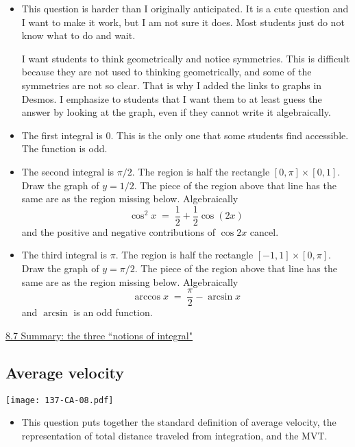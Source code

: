 \documentclass[11pt]{article}
\newcommand {\DS} [1] {${\displaystyle #1}$}
\newcommand{\nl}{\hfill \vspace{-1.1\baselineskip}} %
\newcommand{\vvii}{\hspace{8mm} \href{https://www.youtube.com/watch?v=LBhvzrRyAtk&list=PLlwePzQY_wW_8-sITAbG_GU2JgiuwXkDN&index=7}{8.7 Summary: the three ``notions of integral"}}
\begin{document}
\begin{comments}
\nl
	\begin{itemize}
		\item This question is harder than I originally anticipated.  It is a cute question and I want to make it work, but I am not sure it does.   Most students just do not know what to do and wait.
		
		 I want students to think geometrically and notice symmetries.  This is difficult because they are not used to thinking geometrically, and some of the symmetries are not so clear.  That is why I added the links to graphs in Desmos.  I emphasize to  students that I want them to at least guess the answer by looking at the graph, even if they cannot write it algebraically.
		\item The first integral is $0$.  This is the only one that some students find accessible.  The function is odd.
		\item The second integral is $\pi/2$.  The region is half the rectangle \DS{[0,\pi]\times [0,1]}.  Draw the graph of $y=1/2$.  The piece of the region above that line has the same are as the region missing below.   Algebraically  
			$$
				\cos^2 x \; = \;  \frac{1}{2} + \frac{1}{2} \cos (2x)
			$$
			and the positive and negative contributions of $\cos 2x$ cancel.
		\item The third integral is $\pi$.  The region is half the rectangle \DS{[-1,1]\times [0,\pi]}.   Draw the graph of $y=\pi/2$.  The piece of the region above that line has the same are as the region missing below.  Algebraically
			$$
				\arccos x \; = \; \frac{\pi}{2} - \arcsin x
			$$
			and $\arcsin$ is an odd function.
	\end{itemize}
\end{comments}

\begin{videos}
\vvii
\end{videos}

\newpage
\subsection{Average velocity}

\begin{center}
{ \texttt{[image: 137-CA-08.pdf]}} 
\end{center}

\begin{comments}
\nl
	\begin{itemize}
		\item This question puts together the standard definition of average velocity, the representation of total distance traveled from integration, and the MVT.
	\end{itemize}
\end{comments}
\end{document}
